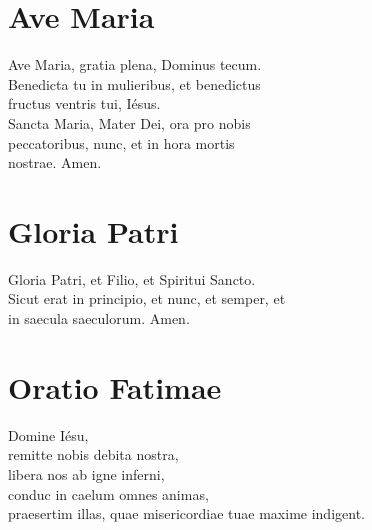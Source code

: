 \documentclass[paper=a5,pagesize=pdftex,fontsize=10pt,headinclude=on,twoside=off]{scrbook}
\begin{document}
\section{Ave Maria}
\begin{scripture}
  \begin{poetry}
    Ave Maria, gratia plena, Dominus tecum.\\
    Benedicta tu in mulieribus, et benedictus\\
    fructus ventris tui, Iésus.\\
    Sancta Maria, Mater Dei, ora pro nobis\\
    peccatoribus, nunc, et in hora mortis\\
    nostrae. Amen.\\
  \end{poetry}
\end{scripture}

\newpage
\section{Gloria Patri}
\begin{scripture}
  \begin{poetry}
    Gloria Patri, et Filio, et Spiritui Sancto.\\
    Sicut erat in principio, et nunc, et semper, et\\
    in saecula saeculorum. Amen.
  \end{poetry}
\end{scripture}

\vspace{18pt}
\section{Oratio Fatimae}
\begin{scripture}
  \begin{poetry}
    Domine Iésu,\\
    remitte nobis debita nostra,\\
    libera nos ab igne inferni,\\
    conduc in caelum omnes animas,\\
    praesertim illas, quae misericordiae tuae maxime indigent.\\
  \end{poetry}
\end{scripture}
\end{document}
